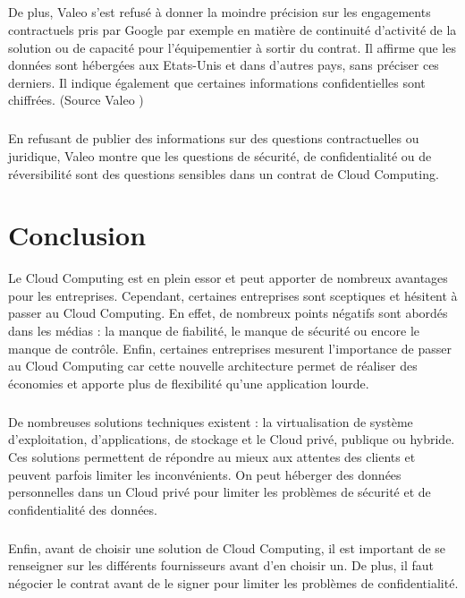 \documentclass[a4paper,12pt]{report}
\begin{document}
\begin{onehalfspace}
	\paragraph*{}
	De plus, Valeo s'est refusé à donner la moindre précision sur les engagements contractuels pris par Google par exemple en matière de continuité d'activité de la solution ou de capacité pour l'équipementier à sortir du contrat. Il affirme que les données sont hébergées aux Etats-Unis et dans d’autres pays, sans préciser ces derniers. Il indique également que certaines informations confidentielles sont chiffrées. (Source Valeo \cite{source:valeo})
	\paragraph*{}
	En refusant de publier des informations sur des questions contractuelles ou juridique, Valeo montre que les questions de sécurité, de confidentialité ou de réversibilité sont des questions sensibles dans un contrat de Cloud Computing.

	\chapter*{Conclusion}
	

Le Cloud Computing est en plein essor et peut apporter de nombreux avantages pour les entreprises. Cependant, certaines entreprises sont sceptiques et hésitent à passer au Cloud Computing. En effet, de nombreux points négatifs sont abordés dans les médias : la manque de fiabilité, le manque de sécurité ou encore le manque de contrôle. Enfin, certaines entreprises mesurent l'importance de passer au Cloud Computing car cette nouvelle architecture permet de réaliser des économies et apporte plus de flexibilité qu’une application lourde.
\paragraph*{}
De nombreuses solutions techniques existent : la virtualisation de système d’exploitation, d’applications, de stockage et le Cloud privé, publique ou hybride. Ces solutions permettent de répondre au mieux aux attentes des clients et peuvent parfois limiter les inconvénients. On peut héberger des données personnelles dans un Cloud privé pour limiter les problèmes de sécurité et de confidentialité des données.
\paragraph*{}
Enfin, avant de choisir une solution de Cloud Computing, il est important de se renseigner sur les différents fournisseurs avant d’en choisir un. De plus, il faut négocier le contrat avant de le signer pour limiter les problèmes de confidentialité. 
	


\end{onehalfspace}
\end{document}

